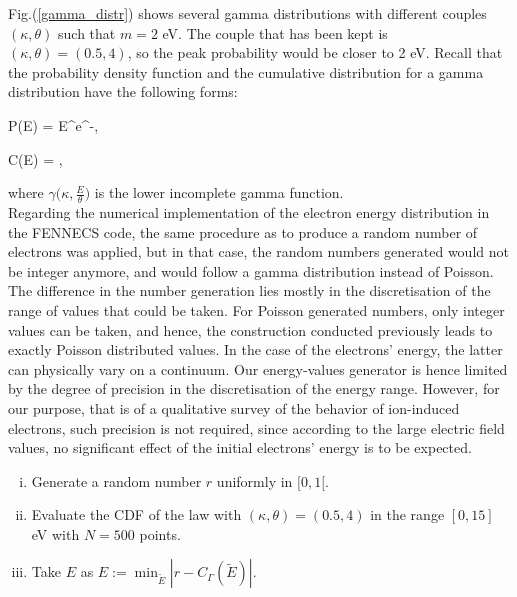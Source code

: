 \noindent Fig.(\ref{gamma_distr}) shows several gamma distributions with different couples $(\kappa, \theta)$ such that $m=2$ eV. The couple that has been kept is $(\kappa,\theta) = (0.5,4)$, so the peak probability would be closer to 2 eV. Recall that the probability density function and the cumulative distribution for a gamma distribution have the following forms: 

\beq
P(E) = E^{}e^{-},
\eeq

\beq
C(E) = ,
\eeq

where $\gamma{\Big(\kappa, \frac{E}{\theta}\Big)}$ is the lower incomplete gamma function.\\ 


\noindent Regarding the numerical implementation of the electron energy distribution in the FENNECS code, the same procedure as to produce a random number of electrons was applied, but in that case, the random numbers generated would not be integer anymore, and would follow a gamma distribution instead of Poisson. The difference in the number generation lies mostly in the discretisation of the range of values that could be taken. For Poisson generated numbers, only integer values can be taken, and hence, the construction conducted previously leads to exactly Poisson distributed values. In the case of the electrons' energy, the latter can physically vary on a continuum. Our energy-values generator is hence limited by the degree of precision in the discretisation of the energy range. However, for our purpose, that is of a qualitative survey of the behavior of ion-induced electrons, such precision is not required, since according to the large electric field values, no significant effect of the initial electrons' energy is to be expected. 

\begin{enumerate}[i)]
\item{Generate a random number $r$ uniformly  in $[0,1[. $}
\item{Evaluate the CDF of the law with  $(\kappa,\theta) = (0.5,4)$ in the range $[0,15]$ eV with $N=500$ points.}
\item{Take $E$ as $E := \min_{\tilde{E}} |r-C_{\Gamma}(\tilde{E})|$}.
\end{enumerate}



